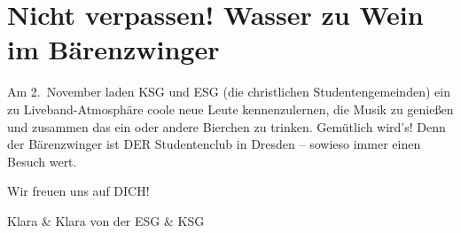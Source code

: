 \section*{Nicht verpassen! Wasser zu Wein im Bärenzwinger}
\label{sec:nicht_verpassen_wasser_zu_wein_im_barenzwinger}

Am 2.\ November laden KSG und ESG (die christlichen Studentengemeinden) ein zu Liveband-Atmosphäre coole neue Leute kennenzulernen, die Musik zu genießen und zusammen das ein oder andere Bierchen zu trinken. Gemütlich wird's! Denn der Bärenzwinger ist DER Studentenclub in Dresden -- sowieso immer einen Besuch wert.

Wir freuen uns auf DICH! 

Klara \& Klara von der ESG \& KSG


